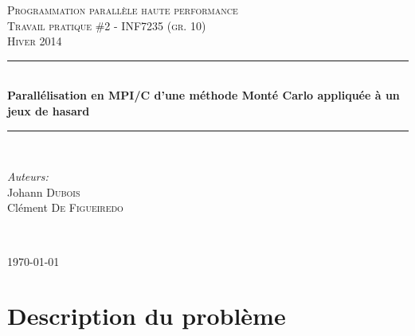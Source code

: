 \documentclass[a4paper,12pt]{article}
\begin{document}


\begin{titlepage}

\newcommand{\HRule}{\rule{\linewidth}{0.5mm}}

\begin{center}

\textsc{\LARGE Programmation parallèle haute performance\\[1.5cm] 
\textsc{\Large Travail pratique \#2 - INF7235 (gr. 10)}}\\[0.5cm]
\textsc{\large Hiver 2014}\\[0.5cm] 

\HRule \\[0.4cm]
{ \huge \bfseries Parallélisation en MPI/C d'une méthode Monté Carlo appliquée à un jeux de hasard }\\[0.4cm] %
\HRule \\[1.5cm]

\end{center}


\begin{minipage}{0.4\textwidth}
\begin{flushleft} \large
\emph{Auteurs:}\\
Johann \textsc{Dubois} %
\\
Clément \textsc{De Figueiredo}
\end{flushleft}
\end{minipage}

~~\\

\begin{center}
{\large \today}\\[3cm] %

\vfill

\end{center}

\end{titlepage}
\newpage %

\tableofcontents %


\renewcommand\thesection{\Roman{section}}

\newpage %


\section{Description du problème}
\end{document}
